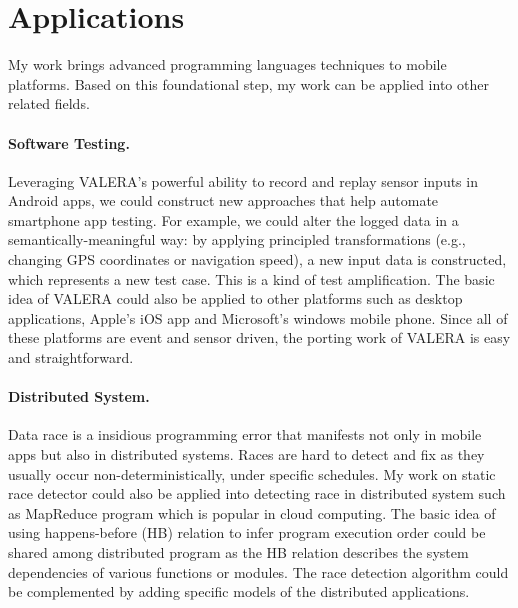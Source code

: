 \documentclass[12pt]{article}
\newcommand{\mypara}[1]{\paragraph*{#1.}}
\newcommand{\mysection}[1]{\section*{#1}}
\newcommand{\valera}{\mbox{{\small \sf VALERA}}\xspace}
\begin{document}


\mysection{Applications}
My work brings advanced programming languages techniques to mobile platforms.
Based on this foundational step, my work can be applied into other related fields.

\mypara{Software Testing}
Leveraging \valera's powerful ability to record and replay sensor inputs in Android apps,
we could construct new approaches that help automate smartphone app testing. For example,
we could alter the logged data in a semantically-meaningful way: by applying principled
transformations (e.g., changing GPS coordinates or navigation speed), a new input data
is constructed, which represents a new test case. This is a kind of test amplification.
The basic idea of \valera could also be applied to other platforms such as desktop applications,
Apple's iOS app and Microsoft's windows mobile phone. Since all of these platforms are
event and sensor driven, the porting work of \valera is easy and straightforward.

\mypara{Distributed System}
Data race is a insidious programming error that manifests not only in mobile apps but also
in distributed systems. Races are hard to detect and fix as they usually occur non-deterministically,
under specific schedules. My work on static race detector could also be applied into detecting
race in distributed system such as MapReduce program which is popular in cloud computing.
The basic idea of using happens-before (HB) relation to infer program execution order could be
shared among distributed program as the HB relation describes the system dependencies of
various functions or modules. The race detection algorithm could be complemented by adding
specific models of the distributed applications.


%
%


\end{document}
